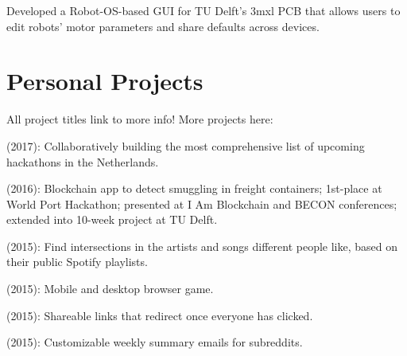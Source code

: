 \documentclass[]{deedy-resume-openfont}
\begin{document}
\begin{minipage}[t]{0.66\textwidth}
\begin{tightemize}
    \item Developed a Robot-OS-based GUI for TU Delft's 3mxl PCB that allows users to edit robots' motor parameters and share defaults across devices.
\end{tightemize}
\vspace{0.5\topsep}


\section{Personal Projects}

All project titles link to more info! More projects here: \href{http://leonoverweel.com/}{}

\begin{tightemize}
    \item \href{http://hackathonlist.nl/}{} (2017): Collaboratively building the most comprehensive list of upcoming hackathons in the Netherlands.
    \item \href{http://leonoverweel.com/world-port-hackathon-2016}{} (2016): Blockchain app to detect smuggling in freight containers; 1st-place at World Port Hackathon; presented at I Am Blockchain and BECON conferences; extended into 10-week project at TU Delft.
    \item \href{http://leonoverweel.com/intersect.ninja}{} (2015): Find intersections in the artists and songs different people like, based on their public Spotify playlists.
    \item \href{http://leonoverweel.com/arc-spin}{} (2015): Mobile and desktop browser game.
    \item \href{http://leonoverweel.com/link-syncer}{} (2015): Shareable links that redirect once everyone has clicked. \item \href{http://leonoverweel.com/reddit-weekly}{} (2015): Customizable weekly summary emails for subreddits.
\end{tightemize}
\sectionsep



\end{minipage}
\end{document}
